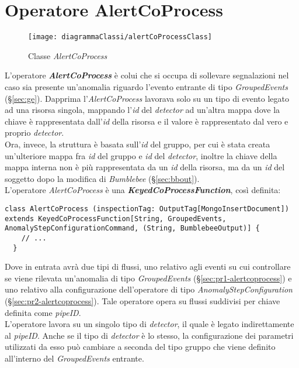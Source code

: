 \section{Operatore AlertCoProcess}\label{sec:alertcoprocess}
\begin{figure}[H] 
    \centering 
    \texttt{[image: diagrammaClassi/alertCoProcessClass]} 
    \caption{Classe \textit{AlertCoProcess}}
\end{figure}
L'operatore \textbf{\textit{AlertCoProcess}} è colui che si occupa di sollevare segnalazioni nel caso sia presente un'anomalia riguardo l'evento entrante di tipo \textit{GroupedEvents} (\S\ref{sec:ge}). Dapprima l'\textit{AlertCoProcess} lavorava solo su un tipo di evento legato ad una risorsa singola, mappando l'\textit{id} del \textit{detector} ad un'altra mappa dove la chiave è rappresentata dall'\textit{id} della risorsa e il valore è rappresentato dal vero e proprio \textit{detector}.\\
Ora, invece, la struttura è basata sull'\textit{id} del gruppo, per cui è stata creata un'ulteriore mappa fra \textit{id} del gruppo e \textit{id} del \textit{detector}, inoltre la chiave della mappa interna non è più rappresentata da un \textit{id} della risorsa, ma da un \textit{id} del soggetto dopo la modifica di \textit{Bumblebee} (\S\ref{sec:bbout}).\\
L'operatore \textit{AlertCoProcess} è una \textbf{\textit{KeyedCoProcessFunction}}, così definita:
\begin{verbatim}
class AlertCoProcess (inspectionTag: OutputTag[MongoInsertDocument]) extends KeyedCoProcessFunction[String, GroupedEvents, AnomalyStepConfigurationCommand, (String, BumblebeeOutput)] {
	// ...
  }
\end{verbatim}
Dove in entrata avrà due tipi di flussi, uno relativo agli eventi su cui controllare se viene rilevata un'anomalia di tipo \textit{GroupedEvents} (\S\ref{sec:pr1-alertcoprocess}) e uno relativo alla configurazione dell'operatore di tipo \textit{AnomalyStepConfiguration} (\S\ref{sec:pr2-alertcoprocess}). Tale operatore opera su flussi suddivisi per chiave definita come \textit{pipeID}.\\
L'operatore lavora su un singolo tipo di \textit{detector}, il quale è legato indirettamente al \textit{pipeID}. Anche se il tipo di \textit{detector} è lo stesso, la configurazione dei parametri utilizzati da esso può cambiare a seconda del tipo gruppo che viene definito all'interno del \textit{GroupedEvents} entrante.


